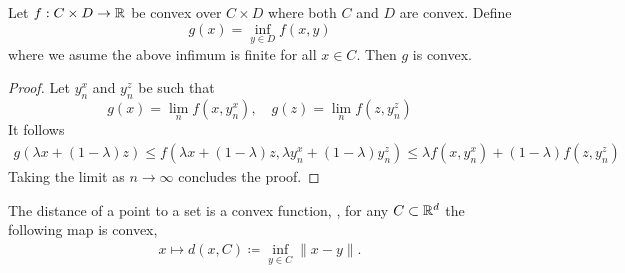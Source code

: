 \begin{theorem}\label{convexity:thm:minimum}
    Let $f:C\times D\rightarrow \mathbb{R}$ be convex over $C\times D$ where both $C$ and $D$ are convex. Define
    \begin{equation}
        g(x) = \inf_{y\in D}f(x,y)
    \end{equation}
    where we asume the above infimum is finite for all $x\in C$. Then $g$ is convex.
\end{theorem}
\begin{proof}
    Let $y_n^x$ and $y_n^z$ be such that 
    \begin{equation}
        g(x) = \lim_n f(x,y_n^x),\quad g(z) = \lim_n f(z,y_n^z)
    \end{equation}
    It follows
    \begin{equation}
        \begin{aligned}
            g(\lambda x + (1-\lambda)z)
            \leq f(\lambda x + (1-\lambda)z, \lambda y_n^x + (1-\lambda)y_n^z)
            \leq \lambda f(x, y_n^x) + (1-\lambda) f(z,y_n^z)
        \end{aligned}
    \end{equation}
    Taking the limit as $n\rightarrow \infty$ concludes the proof.
\end{proof}

\begin{example}
    The distance of a point to a set is a convex function, \ie, for any $C\subset\mathbb{R}^d$ the following map is convex,
    \begin{equation}
        \begin{aligned}
            x\mapsto d(x,C) \coloneqq \inf_{y\in C}\|x-y\|.
        \end{aligned}
    \end{equation}
\end{example}

